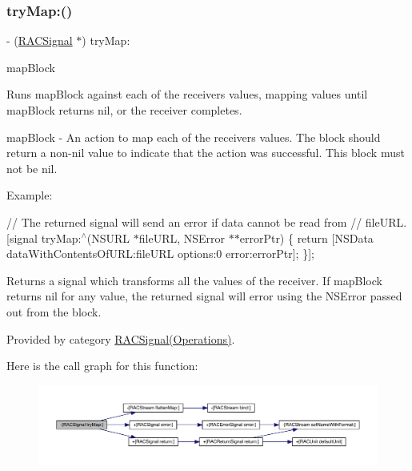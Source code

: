 \mbox{\label{interface_r_a_c_signal_a282c8989886b5b9a75e4ecb298221b58}} 
\subsubsection{\texorpdfstring{try\+Map\+:()}{tryMap:()}\hspace{0.1cm}{\footnotesize\ttfamily [1/3]}}
{\footnotesize\ttfamily -\/ (\mbox{\hyperlink{interface_r_a_c_signal}{R\+A\+C\+Signal}} $\ast$) try\+Map\+: \begin{DoxyParamCaption}\item[{(id($^\wedge$)(id value, N\+S\+Error $\ast$$\ast$error\+Ptr))}]{map\+Block }\end{DoxyParamCaption}}

Runs {\ttfamily map\+Block} against each of the receiver\textquotesingle{}s values, mapping values until {\ttfamily map\+Block} returns nil, or the receiver completes.

map\+Block -\/ An action to map each of the receiver\textquotesingle{}s values. The block should return a non-\/nil value to indicate that the action was successful. This block must not be nil.

Example\+:

// The returned signal will send an error if data cannot be read from // {\ttfamily file\+U\+RL}. \mbox{[}signal try\+Map\+:$^\wedge$(N\+S\+U\+RL $\ast$file\+U\+RL, N\+S\+Error $\ast$$\ast$error\+Ptr) \{ return \mbox{[}N\+S\+Data data\+With\+Contents\+Of\+U\+RL\+:file\+U\+RL options\+:0 error\+:error\+Ptr\mbox{]}; \}\mbox{]};

Returns a signal which transforms all the values of the receiver. If {\ttfamily map\+Block} returns nil for any value, the returned signal will error using the {\ttfamily N\+S\+Error} passed out from the block. 

Provided by category \mbox{\hyperlink{category_r_a_c_signal_07_operations_08_a282c8989886b5b9a75e4ecb298221b58}{R\+A\+C\+Signal(\+Operations)}}.

Here is the call graph for this function\+:\nopagebreak
\begin{figure}[H]
\begin{center}
\leavevmode
\includegraphics[width=350pt]{interface_r_a_c_signal_a282c8989886b5b9a75e4ecb298221b58_cgraph}
\end{center}
\end{figure}
\mbox{\label{interface_r_a_c_signal_a282c8989886b5b9a75e4ecb298221b58}} 
